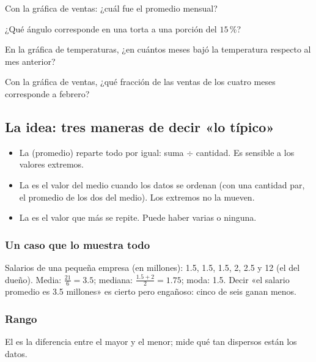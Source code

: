 \taller
{}
\begin{ejercicios}
\item Con la gráfica de ventas: ¿cuál fue el promedio mensual? 
\item ¿Qué ángulo corresponde en una torta a una porción del $15\,\%$? 
\item En la gráfica de temperaturas, ¿en cuántos meses bajó la temperatura respecto al mes anterior? 
\end{ejercicios}
\begin{ejercicios}
\item Con la gráfica de ventas, ¿qué fracción de las ventas de los cuatro meses corresponde a febrero?
\end{ejercicios}

\bitacora


\subsection{La idea: tres maneras de decir «lo típico»}
\begin{itemize}
  \item La  (promedio) reparte todo por igual: suma $\div$ cantidad. Es sensible a los valores extremos.
  \item La  es el valor del medio cuando los datos se ordenan (con una cantidad par, el promedio de los dos
  del medio). Los extremos no la mueven.
  \item La  es el valor que más se repite. Puede haber varias o ninguna.
\end{itemize}

\subsubsection{Un caso que lo muestra todo}
Salarios de una pequeña empresa (en millones): 1.5, 1.5, 1.5, 2, 2.5 y 12 (el del dueño). Media: $\tfrac{21}{6} = 3.5$;
mediana: $\tfrac{1.5 + 2}{2} = 1.75$; moda: 1.5. Decir «el salario promedio es 3.5 millones» es cierto pero engañoso:
cinco de seis ganan menos.

\subsubsection{Rango}
El  es la diferencia entre el mayor y el menor; mide qué tan dispersos están los datos.

